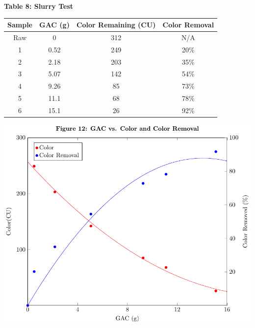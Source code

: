\begin{center}

{\large{\bf Table 8: Slurry Test\\}}
\vspace{3 mm}
\begin{tabular}{|c c c c|}
    \hline
    \textbf{Sample} & \textbf{GAC (g)} & \textbf{Color Remaining (CU)} & \textbf{Color Removal} \\\hline
    Raw & 0  & 312 & N/A \\
    1 & 0.52 & 249 & 20\% \\
    2 & 2.18 & 203 & 35\% \\
    3 & 5.07 & 142 & 54\% \\
    4 & 9.26 & 85  & 73\% \\
    5 & 11.1 & 68  & 78\% \\
    6 & 15.1 & 26  & 92\% \\\hline
\end{tabular}


\includegraphics*[page=1]{figs/fig12.pdf}

\end{center}
\newpage
